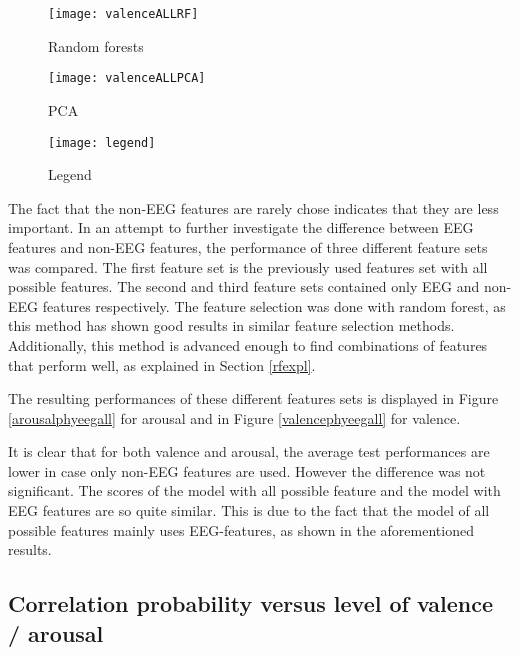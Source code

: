 \begin{figure}[!tbp]
  \begin{minipage}[b]{0.3\textwidth}
    \texttt{[image: valenceALLRF]}
    \caption{Random forests}
  \end{minipage}
  \hfill
  \begin{minipage}[b]{0.3\textwidth}
    \texttt{[image: valenceALLPCA]} %
    \caption{PCA}
  \end{minipage}
  \hfill
  \begin{minipage}[b]{0.3\textwidth}
    \texttt{[image: legend]}
    \caption{Legend\label{valencepieslegend}}
  \end{minipage}
\end{figure}
\clearpage

The fact that the non-EEG features are rarely chose indicates that they are less important. In an attempt to further investigate the difference between EEG features and non-EEG features, the performance of three different feature sets was compared. The first feature set is the previously used features set with all possible features. The second and third feature sets contained only EEG and non-EEG features respectively. The feature selection was done with random forest, as this method has shown good results in similar feature selection methods. Additionally, this method is advanced enough to find combinations of features that perform well, as explained in Section \ref{rfexpl}.

\npar

The resulting performances of these different features sets is displayed in Figure \ref{arousalphyeegall} for arousal and in Figure \ref{valencephyeegall} for valence.



It is clear that for both valence and arousal, the average test performances are lower in case only non-EEG features are used. However the difference was not significant. %
The scores of the model with all possible feature and the model with EEG features are so quite similar. This is due to the fact that the model of all possible features mainly uses EEG-features, as shown in the aforementioned results. 


\subsection{Correlation probability versus level of valence / arousal}



